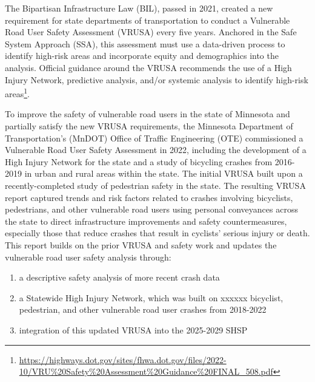 \documentclass[
  letterpaper,
]{scrbook}
\providecommand{\tightlist}{%
  \setlength{\itemsep}{0pt}\setlength{\parskip}{0pt}}\usepackage{longtable,booktabs,array}
\begin{document}
The Bipartisan Infrastructure Law (BIL), passed in 2021, created a new
requirement for state departments of transportation to conduct a
Vulnerable Road User Safety Assessment (VRUSA) every five years.
Anchored in the Safe System Approach (SSA), this assessment must use a
data-driven process to identify high-risk areas and incorporate equity
and demographics into the analysis. Official guidance around the VRUSA
recommends the use of a High Injury Network, predictive analysis, and/or
systemic analysis to identify high-risk areas\footnote{\href{https://highways.dot.gov/sites/fhwa.dot.gov/files/2022-\%2010/VRU\%20Safety\%20Assessment\%20Guidance\%20FINAL_508.pdf}{https://highways.dot.gov/sites/fhwa.dot.gov/files/2022-
  10/VRU\%20Safety\%20Assessment\%20Guidance\%20FINAL\_508.pdf}}.

To improve the safety of vulnerable road users in the state of Minnesota
and partially satisfy the new VRUSA requirements, the Minnesota
Department of Transportation's (MnDOT) Office of Traffic Engineering
(OTE) commissioned a Vulnerable Road User Safety Assessment in 2022,
including the development of a High Injury Network for the state and a
study of bicycling crashes from 2016-2019 in urban and rural areas
within the state. The initial VRUSA built upon a recently-completed
study of pedestrian safety in the state. The resulting VRUSA report
captured trends and risk factors related to crashes involving
bicyclists, pedestrians, and other vulnerable road users using personal
conveyances across the state to direct infrastructure improvements and
safety countermeasures, especially those that reduce crashes that result
in cyclists' serious injury or death. This report builds on the prior
VRUSA and safety work and updates the vulnerable road user safety
analysis through:

\begin{enumerate}
\def\labelenumi{\arabic{enumi})}
\tightlist
\item
  a descriptive safety analysis of more recent crash data
\item
  a Statewide High Injury Network, which was built on xxxxxx bicyclist,
  pedestrian, and other vulnerable road user crashes from 2018-2022
\item
  integration of this updated VRUSA into the 2025-2029 SHSP
\end{enumerate}
\end{document}
